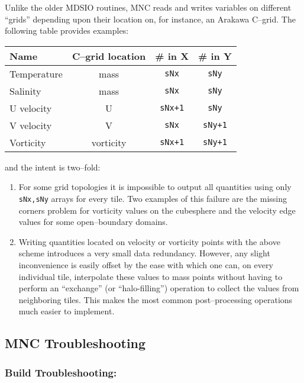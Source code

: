 Unlike the older MDSIO routines, MNC reads and writes variables on
different ``grids'' depending upon their location on, for instance, an
Arakawa C--grid.  The following table provides examples:
\begin{center}
  {\footnotesize
    \begin{tabular}[htb]{|l|c|c|c|}\hline
      \textbf{Name}  &  \textbf{C--grid location}  &  
      \textbf{\# in X}  &  \textbf{\# in Y}  \\\hline
      Temperature & mass & \texttt{sNx} & \texttt{sNy} \\
      Salinity & mass & \texttt{sNx} & \texttt{sNy} \\
      U velocity & U & \texttt{sNx+1} & \texttt{sNy} \\
      V velocity & V & \texttt{sNx} & \texttt{sNy+1} \\
      Vorticity & vorticity & \texttt{sNx+1} & \texttt{sNy+1} \\\hline
    \end{tabular}
  }
\end{center}
and the intent is two--fold:
\begin{enumerate}
\item For some grid topologies it is impossible to output all
  quantities using only \texttt{sNx,sNy} arrays for every tile.  Two
  examples of this failure are the missing corners problem for
  vorticity values on the cubesphere and the velocity edge values for
  some open--boundary domains.
\item Writing quantities located on velocity or vorticity points with
  the above scheme introduces a very small data redundancy.  However,
  any slight inconvenience is easily offset by the ease with which one
  can, on every individual tile, interpolate these values to mass
  points without having to perform an ``exchange'' (or
  ``halo-filling'') operation to collect the values from neighboring
  tiles.  This makes the most common post--processing operations much
  easier to implement.
\end{enumerate}


\subsection{MNC Troubleshooting}

\subsubsection{Build Troubleshooting:}

